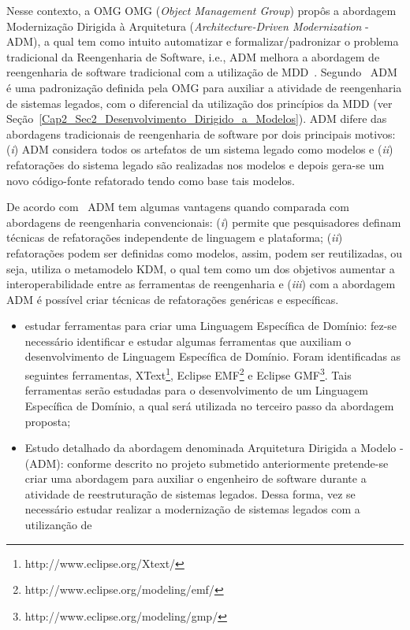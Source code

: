 Nesse contexto, a OMG OMG (\textit{Object Management Group}) propôs a abordagem Modernização Dirigida à Arquitetura (\textit{Architecture-Driven Modernization} - ADM), a qual tem como intuito automatizar e formalizar/padronizar o problema tradicional da Reengenharia de Software, i.e., ADM melhora a abordagem  de reengenharia de software tradicional com a utilização de MDD~\cite{PerezCastillo:2011jo}. Segundo~\citet{rezCastillo:2011gm} ADM é uma padronização definida pela OMG para auxiliar a atividade de reengenharia de sistemas legados, com o diferencial da utilização dos princípios da MDD (ver Seção~\ref{Cap2_Sec2_Desenvolvimento_Dirigido_a_Modelos}). ADM difere das abordagens tradicionais de reengenharia de software por dois principais motivos: (\textit{i}) ADM considera todos os artefatos de um sistema legado como modelos e (\textit{ii}) refatorações do sistema legado são realizadas nos modelos e depois gera-se um novo código-fonte refatorado tendo como base tais modelos. 

De acordo com~\citet{PerezCastillo:2011jo} ADM tem algumas vantagens quando comparada com abordagens de reengenharia convencionais: (\textit{i}) permite que pesquisadores definam técnicas de refatorações independente de linguagem e plataforma; (\textit{ii}) refatorações podem ser definidas como modelos, assim, podem ser reutilizadas, ou seja, utiliza o metamodelo KDM, o qual tem como um dos objetivos aumentar a interoperabilidade entre as ferramentas de reengenharia e (\textit{iii}) com a abordagem ADM é possível criar técnicas de refatorações genéricas e específicas. 


\begin{itemize}

\item estudar ferramentas para criar uma Linguagem Específica de Domínio: fez-se necessário identificar e estudar algumas ferramentas que auxiliam o desenvolvimento de Linguagem Específica de Domínio. Foram identificadas as seguintes ferramentas, XText\footnote{http://www.eclipse.org/Xtext/}, Eclipse EMF\footnote{http://www.eclipse.org/modeling/emf/} e Eclipse GMF\footnote{http://www.eclipse.org/modeling/gmp/}. Tais ferramentas serão estudadas para o desenvolvimento de um Linguagem Específica de Domínio, a qual será utilizada no terceiro passo da abordagem proposta;

\item Estudo detalhado da abordagem denominada Arquitetura Dirigida a Modelo - (ADM): conforme descrito no projeto submetido anteriormente pretende-se criar uma abordagem para auxiliar o engenheiro de software durante a atividade de reestruturação de sistemas legados. Dessa forma, vez se necessário estudar realizar a modernização de sistemas legados com a utilizanção de 

\end{itemize}
